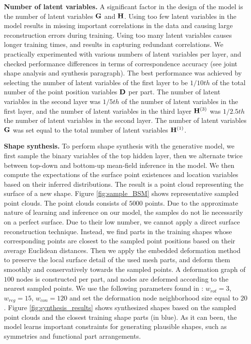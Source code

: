 \textbf{Number of latent variables.} A significant factor in the design of the model is the number of latent variables $\mathbf{G}$ and $\mathbf{H}$. Using too few latent variables in the model results in missing important correlations in the data and causing large reconstruction errors during training. Using too many latent variables causes longer training times, and results in capturing redundant correlations.  We practically experimented with various numbers of latent variables per layer, and checked performance differences in terms of correspondence accuracy (see joint shape analysis and synthesis paragraph).  The best performance was achieved by selecting the number of latent variables of the first layer to be $1/10th$ of the total number of the point position variables $\mathbf{D}$ per part. The number of latent variables in the second layer was $1/5th$ of the number of latent variables in the first layer, and the number of latent variables in the third layer $\mathbf{H}^{(3)}$ was $1/2.5th$ the number of latent variables in the second layer. The number of latent variables $\mathbf{G}$ was set equal to the total number of latent variables $\mathbf{H}^{(1)}$. 

\textbf{Shape synthesis.} To perform shape synthesis with the generative model, we first sample the binary variables of the top hidden layer, then we alternate twice between top-down and bottom-up mean-field inference in the model. We then compute the expectations of the surface point existences and location variables based on their inferred distributions. The result is a point cloud representing the surface of a new shape. Figure \ref{fig:sample_BSM} shows representative sampled point clouds. The point clouds consists of $5000$ points. Due to the approximate nature of learning and inference on our model, the samples do not lie necessarily on a perfect surface. Due to their low number, we cannot apply a direct surface reconstruction technique. Instead, we find parts in the training shapes whose corresponding points are closest to the sampled point positions based on their average Euclidean distances. Then we apply the embedded deformation method \cite{Sumner:2007:EDS} to preserve the local surface detail of the used mesh parts, and deform them smoothly and conservatively towards the sampled points. A deformation graph of $100$ nodes is constructed per part, and nodes are deformed according to the nearest sampled points. We use the following parameters found in \cite{Sumner:2007:EDS}: $w_{rot}=3$,  $w_{reg}=15$, $w_{con}=120$ and set the deformation node neighborhood size equal to $20$. Figure \ref{fig:synthesis_results} shows synthesized shapes based on the sampled point clouds and the closest training shape parts (in blue). As it can been, the model learns important constraints for generating plausible shapes, such as symmetries and functional part arrangements.



